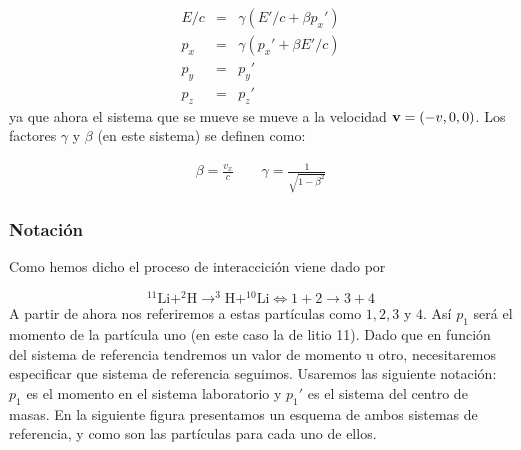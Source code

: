 \begin{eqnarray}
    E/c &  = & \gamma (E'/c +\beta p_x') \label{Ec:08}\\ 
    p_x &  = & \gamma (p_x' + \beta E'/c) \label{Ec:09}\\ 
    p_y &  = & p_y '\\
    p_z &  = & p_z '
\end{eqnarray}
ya que ahora el sistema que se mueve se mueve a la velocidad $\mathbf{v}=(-v,0,0)$. Los factores $\gamma$ y $\beta$ (en este sistema) se definen como:

\begin{eqnarray}
    \beta = \frac{v_x}{c} \quad \quad \gamma = \frac{1}{\sqrt{1- \beta^2}}
\end{eqnarray}

\subsubsection{Notación}

Como hemos dicho el proceso de interaccición viene dado por

\begin{equation}
    ^{11}\mathrm{Li}+^2\mathrm{H} \rightarrow ^3\mathrm{H}+^{10}\mathrm{Li} \Longleftrightarrow 1 + 2 \rightarrow 3 + 4
\end{equation}
A partir de ahora nos referiremos a estas partículas como $1,2,3$ y $4$. Así $p_{1}$ será el momento de la partícula uno (en este caso la de litio 11). Dado que en función del sistema de referencia tendremos un valor de momento u otro, necesitaremos especificar que sistema de referencia seguimos. Usaremos las siguiente notación: $p_{1}$ es el momento en el sistema laboratorio y $p_{1}'$ es el sistema del centro de masas. En la siguiente figura presentamos un esquema de ambos sistemas de referencia, y como son las partículas para cada uno de ellos.  

